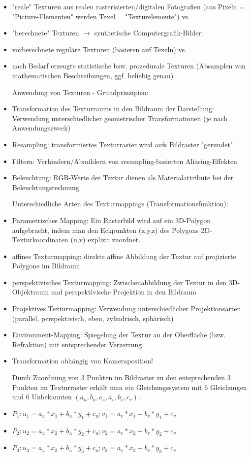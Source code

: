 \documentclass[10pt,landscape]{article}
\begin{document}
\begin{multicols}{3}
{\begin{itemize}
  Erzeugung von Texturen:
  \item "reale" Texturen aus realen rasterisierten/digitalen Fotografien (aus Pixeln = "Picture-Elementen" werden Texel = "Texturelemente") vs.
  \item "berechnete" Texturen $\rightarrow$ synthetische Computergrafik-Bilder:
  \item vorberechnete reguläre Texturen (basieren auf Texeln) vs.
  \item nach Bedarf erzeugte statistische bzw. prozedurale Texturen (Absamplen von mathematischen Beschreibungen, ggf. beliebig genau)
  
  Anwendung von Texturen - Grundprinzipien:
  \item Transformation des Texturraums in den Bildraum der Darstellung: Verwendung unterschiedlicher geometrischer Transformationen (je nach Anwendungszweck)
  \item Resampling: transformiertes Texturraster wird aufs Bildraster "gerundet"
  \item Filtern: Verhindern/Abmildern von resampling-basierten Aliasing-Effekten
  \item Beleuchtung: RGB-Werte der Textur dienen als Materialattribute bei der Beleuchtungsrechnung
  
  Unterschiedliche Arten des Texturmappings (Transformationsfunktion):
  \item Parametrisches Mapping: Ein Rasterbild wird auf ein 3D-Polygon aufgebracht, indem man den Eckpunkten (x,y,z) des Polygons 2D-Texturkoordinaten (u,v) explizit zuordnet.
  \item affines Texturmapping: direkte affine Abbildung der Textur auf projizierte Polygone im Bildraum
  \item perspektivisches Texturmapping: Zwischenabbildung der Textur in den 3D-Objektraum und perspektivische Projektion in den Bildraum
  \item Projektives Texturmapping: Verwendung unterschiedlicher Projektionsarten (parallel, perspektivisch, eben, zylindrisch, sphärisch)
  \item Environment-Mapping: Spiegelung der Textur an der Oberfläche (bzw. Refraktion) mit entsprechender Verzerrung
  \item Transformation abhängig von Kameraposition!
  
  Durch Zuordnung von 3 Punkten im Bildraster zu den entsprechenden 3 Punkten im Texturraster erhält man ein Gleichungssystem mit 6 Gleichungen und 6 Unbekannten $(a_u , b_u , c_u , a_v , b_v , c_v )$:
  \item $P_1: u_1=a_u*x_1+b_u*y_1+c_u; v_1=a_v*x_1+b_v*y_1+c_v$
  \item $P_2: u_2=a_u*x_2+b_u*y_2+c_u; v_2=a_v*x_2+b_v*y_2+c_v$
  \item $P_3: u_3=a_u*x_3+b_u*y_3+c_u; v_3=a_v*x_3+b_v*y_3+c_v$
  

\end{itemize}}
\end{multicols}
\end{document}
